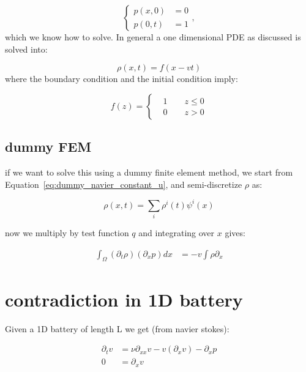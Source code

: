 \documentclass{article}
\begin{document}
\begin{equation*}
    \left\{ 
        \begin{aligned}
            p(x, 0) &= 0 \\
            p(0, t) &= 1            
        \end{aligned}
        \right.,
\end{equation*}
which we know how to solve. In general a one dimensional PDE as discussed is solved into:

\begin{equation*}
    \rho(x, t) = f(x-vt)
\end{equation*}
where the boundary condition and the initial condition imply:

\begin{equation*}
    f(z) = \left\{\begin{aligned}
        &1 \qquad z\leq 0 \\
        &0 \qquad z>0
    \end{aligned}\right.
\end{equation*}

\subsection*{dummy FEM}

if we want to solve this using a dummy finite element method, we start from Equation~\ref{eq:dummy_navier_constant_u}, and semi-discretize $\rho$ as:

\begin{equation*}
    \rho(x, t) = \sum_i \rho^i(t)\psi^i(x)
\end{equation*}

now we multiply by test function $q$ and integrating over $x$ gives:

\begin{align*}
    \int_\Omega (\partial_t\rho) (\partial_x p) dx &= -v \int \rho \partial_x
\end{align*}

\section*{contradiction in 1D battery}

Given a 1D battery of length L we get (from navier stokes):

\begin{align*}
    \partial_t v &= \nu \partial_{xx} v-v (\partial_x v)-\partial_x p\\
    0 &= \partial_x v
\end{align*}
\end{document}
